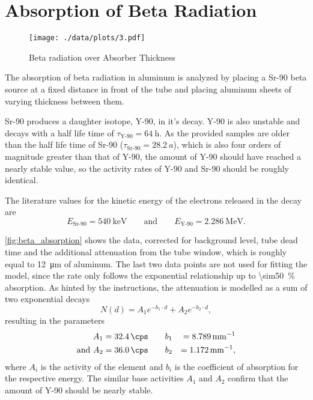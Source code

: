 \chapter{Absorption of Beta Radiation}

\begin{figure}[ht!]
	\centering
	\texttt{[image: ./data/plots/3.pdf]}
	\caption{Beta radiation over Absorber Thickness}
	\label{fig:beta_absorption}
\end{figure}

The absorption of beta radiation in aluminum is analyzed by placing a Sr-90 beta source at a fixed distance in front of the tube and placing aluminum sheets of varying thickness between them.

Sr-90 produces a daughter isotope, Y-90, in it's decay. Y-90 is also unstable and decays with a half life time of $\tau_\text{Y-90} = \SI{64}{\hour}$.
As the provided samples are older than the half life time of Sr-90 ($\tau_\text{Sr-90} = \SI{28.2}{a}$), which is also four orders of magnitude greater than that of Y-90, the amount of Y-90 should have reached a nearly stable value, so the activity rates of Y-90 and Sr-90 should be roughly identical.

The literature values for the kinetic energy of the electrons released in the decay are
\begin{equation*}
	E_\text{Sr-90} = \SI{540}{\keV} \qquad \text{and} \qquad E_\text{Y-90} = \SI{2.286}{\MeV}.
\end{equation*}

\autoref{fig:beta_absorption} shows the data, corrected for background level, tube dead time and the additional attenuation from the tube window, which is roughly equal to \SI{12}{\micro\meter} of aluminum.
The last two data points are not used for fitting the model, since the rate only follows the exponential relationship up to \SI{\sim50}{\percent} absorption.
As hinted by the instructions, the attenuation is modelled as a sum of two exponential decays
\begin{equation*}
	N(d) = A_1 e^{-b_1 \cdot d} + A_2 e^{-b_2 \cdot d},
\end{equation*}
resulting in the parameters
\begin{alignat*}{2}
	A_1 &= \SI{32.4}{\cps} \qquad b_1 &= \SI{8.789}{\milli\meter^{-1}}\\
	\text{and } A_2 &= \SI{36.0}{\cps} \qquad b_2 &= \SI{1.172}{\milli\meter^{-1}},
\end{alignat*}
where $A_i$ is the activity of the element and $b_i$ is the coefficient of absorption for the respective energy.
The similar base activities $A_1$ and $A_2$ confirm that the amount of Y-90 should be nearly stable.

